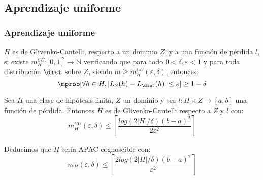\subsection{Aprendizaje uniforme}
\begin{frame}\frametitle{Aprendizaje uniforme}
 \begin{definition}
  $H$ es de Glivenko-Cantelli, respecto a un dominio $Z$, y a 
  una función de pérdida $l$, si existe ${m_{H}^{CU}: ]0,1[^2 \rightarrow \mathbb{N}}$ 
  verificando que para todo $0 < \delta, \varepsilon < 1$ y para toda distribución $\dist$ sobre $Z$, 
  siendo $m \ge m_{H}^{CU}(\varepsilon, \delta)$, entonces:
  \[
    \mprob [\forall h\in H, |L_S(h) - L_{\dist}(h)| \le \varepsilon] \ge 1-\delta
  \]
 \end{definition}
 
 \begin{fact}
  Sea $H$ una clase de hipótesis finita, $Z$ un dominio y sea $l : H \times Z \rightarrow [a,b]$ una función de pérdida.
  Entonces $H$ es de Glivenko-Cantelli respecto a $Z$ y $l$ con:
  \[
    m_{H}^{CU}(\varepsilon, \delta) \le \left\lceil \frac{log(2|H|/\delta)(b-a)^2}{2\varepsilon^2} \right\rceil
  \]
  
  Deducimos que $H$ sería APAC cognoscible con:
  \[
    m_{H}( \varepsilon, \delta ) \le \left\lceil \frac{2 log(2|H|/\delta)(b-a)^2}{\varepsilon^2} \right\rceil
  \]
 \end{fact}
\end{frame}


